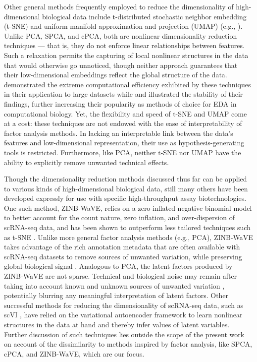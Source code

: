 Other general methods frequently employed to reduce the dimensionality of high-dimensional biological data include t-distributed stochastic neighbor embedding (t-SNE) \citep{Maaten08visualizingdata} and uniform manifold approximation and projection (UMAP) \citep{McInnes2018} (e.g., \citep{Amir2013, Becht2019}). Unlike PCA, SPCA, and cPCA, both are nonlinear dimensionality reduction techniques --- that is, they do not enforce linear relationships between features. Such a relaxation permits the capturing of local nonlinear structures in the data that would otherwise go unnoticed, though neither approach guarantees that their low-dimensional embeddings reflect the global structure of the data. \citet{Becht2019} demonstrated the extreme computational efficiency exhibited by these techniques in their application to large datasets while \citet{Amir2013} and \citet{Becht2019} illustrated the stability of their findings, further increasing their popularity as methods of choice for EDA in computational biology. Yet, the flexibility and speed of t-SNE and UMAP come at a cost: these techniques are not endowed with the ease of interpretability of factor analysis methods. In lacking an interpretable link between the data's features and low-dimensional representation, their use as hypothesis-generating tools is restricted. Furthermore, like PCA, neither t-SNE nor UMAP have the ability to explicitly remove unwanted technical effects.

Though the dimensionality reduction methods discussed thus far can be applied to various kinds of high-dimensional biological data, still many others have been developed expressly for use with specific high-throughput assay biotechnologies. One such method, ZINB-WaVE, relies on a zero-inflated negative binomial model to better account for the count nature, zero inflation, and over-dispersion of scRNA-seq data, and has been shown to outperform less tailored techniques such as t-SNE \citep{risso2017zinb}. Unlike more general factor analysis methods (e.g., PCA), ZINB-WaVE takes advantage of the rich annotation metadata that are often available with scRNA-seq datasets to remove sources of unwanted variation, while preserving global biological signal \citep{risso2017zinb}. Analogous to PCA, the latent factors produced by ZINB-WaVE are not sparse. Technical and biological noise may remain after taking into account known and unknown sources of unwanted variation \citep{risso2017zinb}, potentially blurring any meaningful interpretation of latent factors. Other successful methods for reducing the dimensionality of scRNA-seq data, such as scVI \citep{Lopez2018}, have relied on the variational autoencoder framework to learn nonlinear structures in the data at hand and thereby infer values of latent variables. Further discussion of such techniques lies outside the scope of the present work on account of the dissimilarity to methods inspired by factor analysis, like SPCA, cPCA, and ZINB-WaVE, which are our focus.